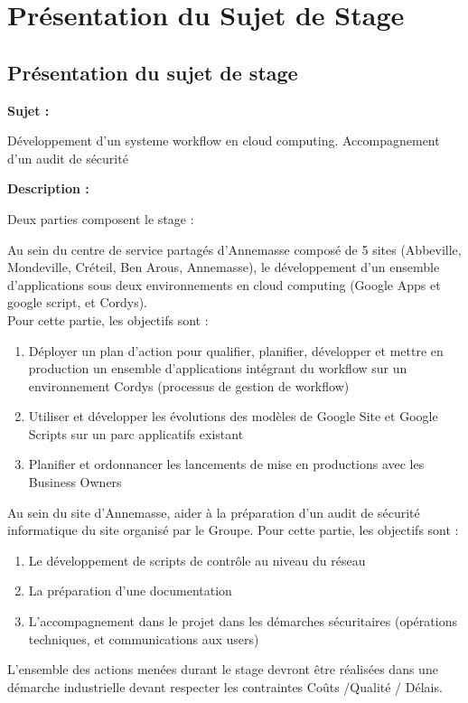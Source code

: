 \chapter{Présentation du Sujet de Stage}

\section{Présentation du sujet de stage}
	\textbf{Sujet :}
	
	Développement d'un systeme workflow en cloud computing. Accompagnement d'un audit de sécurité
	
	\textbf{Description :}
	
Deux parties composent le stage :

Au sein du centre de service partagés d'Annemasse composé de 5 sites (Abbeville, Mondeville, Créteil, Ben Arous, Annemasse), le développement d'un ensemble d'applications sous deux environnements en cloud computing (Google Apps et google script, et Cordys). \\
Pour cette partie, les objectifs sont : 
\begin{enumerate}
	\item Déployer un plan d'action pour qualifier, planifier, développer et mettre en production un ensemble d'applications intégrant du workflow sur un environnement Cordys (processus de gestion de workflow)
	\item Utiliser et développer les évolutions des modèles de Google Site et Google Scripts sur un parc applicatifs existant
	\item Planifier et ordonnancer les lancements de mise en productions avec les Business Owners
\end{enumerate}
\vspace{6mm}

Au sein du site d'Annemasse, aider à la préparation d'un audit de sécurité informatique du site organisé par le Groupe.
Pour cette partie, les objectifs sont :
\begin{enumerate}
	\item Le développement de scripts de contrôle au niveau du réseau
	\item La préparation d'une documentation
	\item L'accompagnement dans le projet dans les démarches sécuritaires (opérations techniques, et communications aux users)
\end{enumerate}
\vspace{6mm}

L'ensemble des actions menées durant le stage devront être réalisées dans une démarche industrielle devant respecter les contraintes Coûts /Qualité / Délais. 

